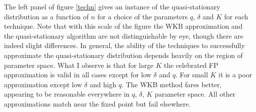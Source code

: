 The left panel of figure \ref{techn} gives an instance of the quasi-stationary distribution as a function of $n$ for a choice of the parameters $q$, $\delta$ and $K$ for each technique. 
Note that with this scale of the figure the WKB approximation and the quasi-stationary algorithm are not distinguishable by eye, though there are indeed slight differences. 
In general, the ability of the techniques to successfully approximate the quasi-stationary distribution depends heavily on the region of parameter space. 
What I observe is that for large $K$ the celebrated FP approximation is valid in all cases except for low $\delta$ and $q$. 
For small $K$ it is a poor approximation except low $\delta$ and high $q$. %
The WKB method fares better, appearing to be reasonable everywhere in $q$, $\delta$, $K$ parameter space. 
All other approximations match near the fixed point but fail elsewhere. 
%
%
